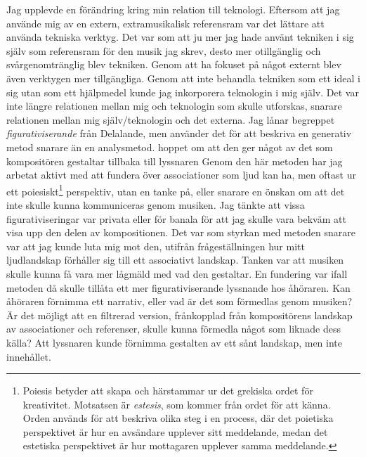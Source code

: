 \documentclass{article}
\begin{document}
Jag upplevde en förändring kring min relation till teknologi. Eftersom att jag använde mig av en extern,
extramusikalisk referensram var det lättare att använda tekniska verktyg. Det var som att ju mer jag hade
använt tekniken i sig själv som referensram för den musik jag skrev, desto mer otillgänglig och
svårgenomtränglig blev tekniken. Genom att ha fokuset på något externt blev även verktygen mer tillgängliga.
Genom att inte behandla tekniken som ett ideal i sig utan som ett hjälpmedel kunde jag inkorporera teknologin
i mig själv. Det var inte längre relationen mellan mig och teknologin som skulle utforskas, snarare relationen
mellan mig själv/teknologin och det externa. 
Jag lånar begreppet \emph{figurativiserande} från Delalande, men använder det för att beskriva en generativ
metod snarare än en  analysmetod. %
hoppet om att den ger något av det som kompositören gestaltar tillbaka till lyssnaren Genom den här metoden
har jag arbetat aktivt med att fundera över associationer som ljud kan ha, men oftast ur ett
poiesiskt\footnote{Poiesis betyder att skapa och härstammar ur det grekiska ordet för kreativitet. Motsatsen
är \emph {estesis}, som kommer från ordet för att känna. Orden används för att beskriva olika steg i en
process, där det poietiska perspektivet är hur en avsändare upplever sitt meddelande, medan det estetiska
perspektivet är hur mottagaren upplever samma meddelande.} perspektiv, utan en tanke på, eller snarare en önskan om att
det inte skulle kunna kommuniceras genom musiken. Jag tänkte att vissa figurativiseringar var privata
eller för banala för att jag skulle vara bekväm att visa upp den delen av kompositionen. Det var som styrkan
med metoden snarare var att jag kunde luta mig mot den, utifrån frågeställningen hur mitt ljudlandskap
förhåller sig till ett associativt landskap. Tanken var att musiken skulle kunna få vara mer lågmäld med vad
den gestaltar. En fundering var ifall metoden då skulle tillåta ett mer figurativiserande lyssnande hos
åhöraren.
Kan åhöraren förnimma ett narrativ, eller vad är det som förmedlas genom musiken? Är det möjligt att en
filtrerad version, frånkopplad från kompositörens landskap av associationer och referenser, skulle kunna
förmedla något som liknade dess källa? Att lyssnaren kunde förnimma gestalten av ett sånt landskap, men inte
innehållet.


\pagebreak

\printbibliography[heading=subbibliography, title={Litteratur}, nottype=music, nottype=online, nottype=misc]
\printbibliography[heading=subbibliography, title={Musik}, type=music]
\printbibliography[heading=subbibliography, title={Uppslagsverk}, type=misc]
\printbibliography[heading=subbibliography, title={Webb}, type=online]
\end{document}
